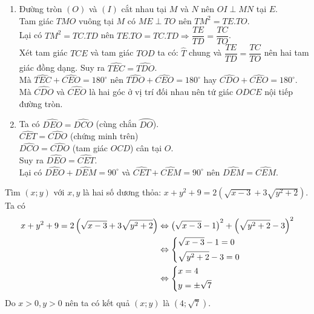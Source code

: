 \begin{ex}
{\begin{enumerate}
\item Đường tròn $(O)$ và $(I)$ cắt nhau tại $M$ và $N$ nên $OI\perp MN$ tại $E$.\\Tam giác $TMO$ vuông tại $M$ có $ME\perp TO$ nên $TM^2=TE.TO$.\\Lại có $TM^2=TC.TD$ nên $TE.TO=TC.TD\Rightarrow \dfrac{TE}{TD}=\dfrac{TC}{TO}$.\\Xét tam giác $TCE$ và tam giác $TOD$ ta có: $\widehat{T}$ chung và $\dfrac{TE}{TD}=\dfrac{TC}{TO}$ nên hai tam giác đồng dạng. Suy ra $\widehat{TEC}=\widehat{TDO}$.\\
Mà $\widehat{TEC}+\widehat{CEO}=180^\circ$ nên $\widehat{TDO}+\widehat{CEO}=180^\circ$ hay $\widehat{CDO}+\widehat{CEO}=180^\circ$.\\Mà $\widehat{CDO}$ và $\widehat{CEO}$ là hai góc ở vị trí đối nhau nên tứ giác $ODCE$ nội tiếp đường tròn.
\item Ta có $\widehat{DEO}=\widehat{DCO}$ (cùng chắn $\wideparen{DO}$).\\ $\widehat{CET}=\widehat{CDO}$ (chứng minh trên)\\ $\widehat{DCO}=\widehat{CDO}$ (tam giác $OCD$) cân tại $O$.\\
Suy ra $\widehat{DEO}=\widehat{CET}$.\\Lại có $\widehat{DEO}+\widehat{DEM}=90^\circ$ và $\widehat{CET}+\widehat{CEM}=90^\circ$ nên $\widehat{DEM}=\widehat{CEM}$.
    \end{enumerate}
    }
\end{ex}

\begin{ex}%
    Tìm $(x;y)$ với $x, y$ là hai số dương thỏa: $x+y^2+9=2\left(\sqrt{x-3}+3\sqrt{y^2+2}\right)$.
\loigiai
    {Ta có
    \begin{align*}
x+y^2+9=2\left(\sqrt{x-3}+3\sqrt{y^2+2}\right)&\Leftrightarrow \left(\sqrt{x-3}-1\right)^2+\left(\sqrt{y^2+2}-3\right)^2\\ 
&\Leftrightarrow \left\{\begin{aligned}&\sqrt{x-3}-1=0\\&\sqrt{y^2+2}-3=0\end{aligned}\right.\\
&\Leftrightarrow\left\{\begin{aligned}&x=4\\&y=\pm\sqrt{7}\end{aligned}\right.
\end{align*}
Do $x>0, y>0$ nên ta có kết quả $(x;y)$ là $\left(4;\sqrt{7}\right)$.
    }
\end{ex}

